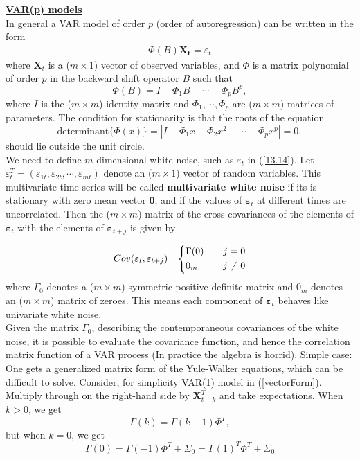 \noindent
\textbf{\underline{VAR(p) models}}\\

In general a VAR model of order $p$ (order of autoregression) can be written in the form \begin{align}
    \Phi(B) \mathbf{X_t} = \varepsilon_t \label{13.14}
\end{align} where $\mathbf{X}_t$ is a ($m\times 1$) vector of observed variables, and $\Phi$ is a matrix polynomial of order $p$ in the backward shift operator $B$ such that \[
\Phi(B)=I- \Phi_1 B- \cdots - \Phi_p B^p,
\] where $I$ is the ($m\times m$) identity matrix and $\Phi_1, \cdots, \Phi_p$ are ($m\times m$) matrices of parameters. The condition for stationarity is that the roots of the equation \[
\text{determinant}\{\Phi(x)\} = |I-\Phi_1x - \Phi_2 x^2 - \cdots - \Phi_px^p|=0,
\] should lie outside the unit circle.\\

We need to define $m$-dimensional white noise, such as $\varepsilon_t$ in (\ref{13.14}). Let $\varepsilon_t^T=(\varepsilon_{1t},\varepsilon_{2t},\cdots,\varepsilon_{mt})$ denote an ($m \times 1$) vector of random variables. This multivariate time series will be called \textbf{multivariate white noise} if its is stationary with zero mean vector $\mathbf{0}$, and if the values of $\mathbf{\varepsilon}_t$ at different times are uncorrelated. Then the ($m\times m$) matrix of the cross-covariances of the elements of $\mathbf{\varepsilon}_t$ with the elements of $\mathbf{\varepsilon}_{t+j}$ is given by 

\begin{subequations}
\begin{equation}
\begin{array}{r@{}l}
Cov(\mathbf{\varepsilon}_t, \mathbf{\varepsilon}_{t+j}) = & \left\{
\begin{aligned}
    &\Gamma(0) & \quad & j=0 \nonumber \\
    &0_m & \quad & j \neq 0 \nonumber
\end{aligned}
\right.
\end{array}
\end{equation}
\end{subequations}
where $\Gamma_0$ denotes a ($m\times m$) symmetric positive-definite matrix and $0_m$ denotes an ($m \times m$) matrix of zeroes. This means each component of $\mathbf{\varepsilon}_t$ behaves like univariate white noise.\\

Given the matrix $\Gamma_0$, describing the contemporaneous covariances of the white noise, it is possible to evaluate the covariance function, and hence the correlation matrix function of a VAR process (In practice the algebra is horrid). Simple case: One gets a generalized matrix form of the Yule-Walker equations, which can be difficult to solve. Consider, for simplicity VAR(1) model in (\ref{vectorForm}). Multiply through on the right-hand side by $\mathbf{X}_{t-k}^T$ and take expectations. When $k>0$, we get \[
\Gamma(k)=\Gamma(k-1) \Phi^T,
\] but when $k=0$, we get \[
\Gamma(0) =\Gamma(-1)\Phi^T + \Sigma_0 =\Gamma(1)^T \Phi^T + \Sigma_0
\]

